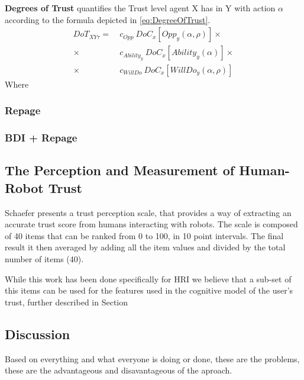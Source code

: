 \textbf{Degrees of Trust} quantifies the Trust level agent X has in Y with action $\alpha$ according to the formula depicted in \ref{eq:DegreeOfTrust}.
\begin{equation}
	\begin{aligned}
		DoT_{XY\tau} =\ &c_{Opp}\ DoC_x[Opp_y(\alpha, \rho)] \times\\
					    \times\ &c_{Ability_y}\ DoC_x[Ability_y(\alpha)]\times \\
					    \times\ &c_{WillDo}\ DoC_x[WillDo_y(\alpha, \rho)]
	\end{aligned}
	\label{eq:DegreeOfTrust}
\end{equation}
Where 


\subsubsection{Repage}


\subsubsection{BDI + Repage}

\subsection{The Perception and Measurement of Human-Robot Trust}
\label{subsec:Related work:The Perception and Measurement of Human-Robot Trust}

Schaefer\cite{Schaefer2009} presents a trust perception scale, that provides a way of extracting an accurate trust score from humans interacting with robots. The scale is composed of 40 items that can be ranked from 0 to 100, in 10 point intervals. The final result it then averaged by adding all the item values and divided by the total number of items (40).



While this work has been done specifically for \ac{HRI} we believe that a sub-set of this items can be used for the features used in the cognitive model of the user's trust, further described in Section %






\subsection{Discussion}
\label{subsec:RelWorkDiscussion}

Based on everything and what everyone is doing or done, these are the problems, these are the advantageous and disavantageous of the aproach.